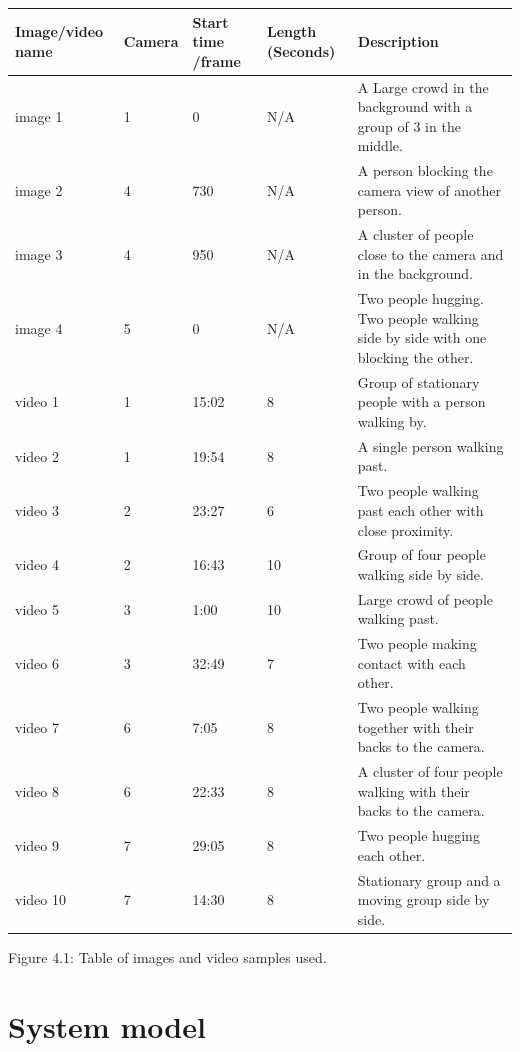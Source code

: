 \documentclass[12pt]{report}
\begin{document}
\begin{center}
\footnotesize
	\begin{tabular}{|p{2.2cm}|l|p{1.8cm}|p{2cm}|p{5cm}|}
		\hline
		Image/video name & Camera & Start time /frame & Length (Seconds) & Description \\
		\hline
		image 1 & 1 & 0 & N/A & A Large crowd in the background with a group of 3 in the middle. \\
		\hline
		image 2 & 4 & 730 & N/A & A person blocking the camera view of another person. \\
		\hline
		image 3 & 4 & 950 & N/A & A cluster of people close to the camera and in the background. \\
		\hline
		image 4 & 5 & 0 & N/A & Two people hugging. Two people walking side by side with one blocking the other. \\
		\hline
		video 1 & 1 & 15:02 & 8 & Group of stationary people with a person walking by. \\
		\hline
		video 2 & 1 & 19:54 & 8 & A single person walking past. \\
		\hline
		video 3 & 2 & 23:27 & 6 & Two people walking past each other with close proximity. \\
		\hline
		video 4 & 2 & 16:43 & 10 & Group of four people walking side by side. \\
		\hline
		video 5 & 3 & 1:00 & 10 & Large crowd of people walking past. \\
		\hline
		video 6 & 3 & 32:49 & 7 & Two people making contact with each other. \\ 
		\hline
		video 7 & 6 & 7:05 & 8 & Two people walking together with their backs to the camera. \\
		\hline
		video 8 & 6 & 22:33 & 8 & A cluster of four people walking with their backs to the camera. \\
		\hline 
		video 9 & 7 & 29:05 & 8 & Two people hugging each other. \\
		\hline
		video 10 & 7 & 14:30 & 8 & Stationary group and a moving group side by side. \\
		\hline
	\end{tabular}
\vspace{4mm}

{Figure 4.1: Table of images and video samples used.}

\end{center}

\section{System model}
\end{document}
